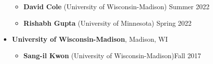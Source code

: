 \begin{itemize}[itemsep=1pt, parsep=0pt,leftmargin=*]
\begin{itemize}[itemsep=1pt, parsep=0pt,leftmargin=*]
  \item[] \textbf{David Cole} (University of Wisconsin-Madison) \hfill Summer 2022
  \item[] \textbf{Rishabh Gupta} (University of Minnesota) \hfill Spring 2022
  \end{itemize}
\item[] \textbf{University of Wisconsin-Madison}, Madison, WI
  \begin{itemize}[itemsep=1pt, parsep=0pt,leftmargin=*]
  \item[] \textbf{Sang-il Kwon} (University of Wisconsin-Madison)\hfill Fall 2017
  \end{itemize}
\end{itemize}
